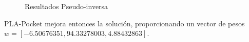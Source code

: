 \documentclass[a4]{article}
\begin{document}
\begin{figure}[H]
	\centering    
	\caption{Resultados Pseudo-inversa}
	\label{fig:pseudo-inversa}
\end{figure}

PLA-Pocket mejora entonces la solución, proporcionando un vector de pesos\\ $w=[-6.50676351, 94.33278003,  4.88432863]$.
\end{document}
